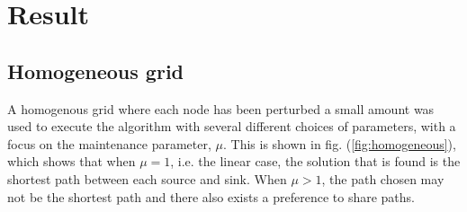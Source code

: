 \section{Result}
\label{sec:result}

\subsection{Homogeneous grid}

A homogenous grid where each node has been perturbed a small amount was used to execute the algorithm with several different choices of parameters, with a focus on the maintenance parameter, $\mu$. This is shown in fig. (\ref{fig:homogeneous}), which shows that when $\mu = 1$, i.e. the linear case, the solution that is found is the shortest path between each source and sink. When $\mu > 1$, the path chosen may not be the shortest path and there also exists a preference to share paths.

